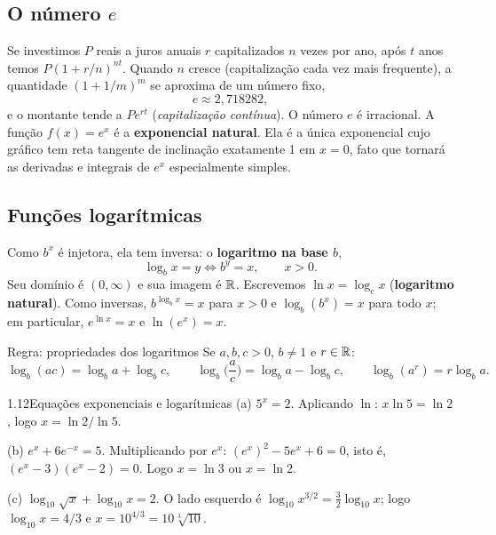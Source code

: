 \subsection{O número $e$}

Se investimos $P$ reais a juros anuais $r$ capitalizados $n$ vezes por ano, após $t$ anos
temos $P(1+r/n)^{nt}$. Quando $n$ cresce (capitalização cada vez mais frequente), a
quantidade $(1+1/m)^m$ se aproxima de um número fixo,
\[
e\approx2{,}718282,
\]
e o montante tende a $Pe^{rt}$ (\emph{capitalização contínua}). O número $e$ é irracional.
A função $f(x)=e^x$ é a \textbf{exponencial natural}. Ela é a única exponencial cujo
gráfico tem reta tangente de inclinação exatamente 1 em $x=0$, fato que tornará as
derivadas e integrais de $e^x$ especialmente simples.

\subsection{Funções logarítmicas}

Como $b^x$ é injetora, ela tem inversa: o \textbf{logaritmo na base $b$},
\[
\log_b x=y \iff b^y=x,\qquad x>0 .
\]
Seu domínio é $(0,\infty)$ e sua imagem é $\mathbb{R}$. Escrevemos $\ln x=\log_e x$
(\textbf{logaritmo natural}). Como inversas, $b^{\log_b x}=x$ para $x>0$ e
$\log_b(b^x)=x$ para todo $x$; em particular, $e^{\ln x}=x$ e $\ln(e^x)=x$.


\begin{regra}{Regra: propriedades dos logaritmos}
Se $a,b,c>0$, $b\neq1$ e $r\in\mathbb{R}$:
\[
\log_b(ac)=\log_b a+\log_b c,\qquad
\log_b\Big(\frac ac\Big)=\log_b a-\log_b c,\qquad
\log_b(a^r)=r\log_b a .
\]
\end{regra}

\begin{exemplo}{1.12}{Equações exponenciais e logarítmicas}
(a) $5^x=2$. Aplicando $\ln$: $x\ln5=\ln2$, logo $x=\ln2/\ln5$.

(b) $e^x+6e^{-x}=5$. Multiplicando por $e^x$: $(e^x)^2-5e^x+6=0$, isto é,
$(e^x-3)(e^x-2)=0$. Logo $x=\ln3$ ou $x=\ln2$.

(c) $\log_{10}\sqrt x+\log_{10}x=2$. O lado esquerdo é
$\log_{10}x^{3/2}=\tfrac32\log_{10}x$; logo $\log_{10}x=4/3$ e $x=10^{4/3}=10\sqrt[3]{10}$.
\end{exemplo}

